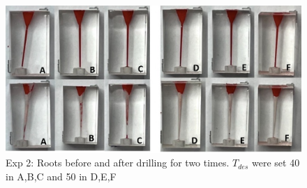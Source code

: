 \begin{figure}[htbp]
\begin{center}
\includegraphics[width=1\linewidth]{Images/exp/roots.png}
\caption{Exp 2: Roots before and after drilling for two times. $T_{des}$ were set 40 in A,B,C and 50 in D,E,F}
\label{fig: exp2_roots}
\end{center}
\end{figure}	

